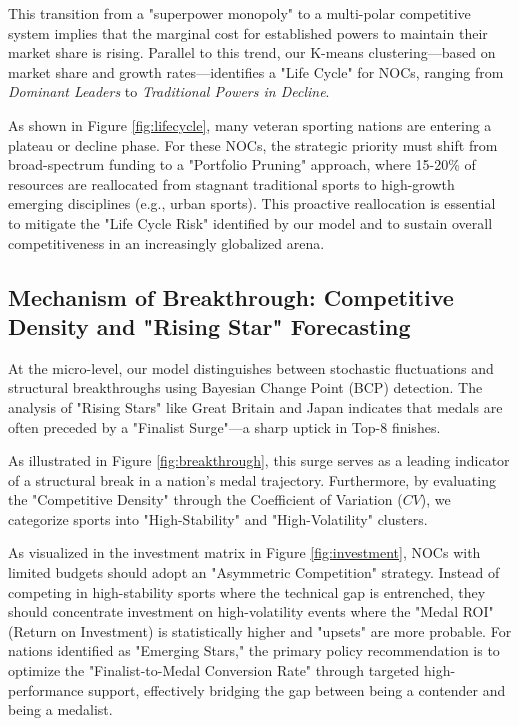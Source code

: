 \documentclass{mcmthesis}
\begin{document}
This transition from a "superpower monopoly" to a multi-polar competitive system implies that the marginal cost for established powers to maintain their market share is rising. Parallel to this trend, our K-means clustering—based on market share and growth rates—identifies a "Life Cycle" for NOCs, ranging from \textit{Dominant Leaders} to \textit{Traditional Powers in Decline}. 



As shown in Figure \ref{fig:lifecycle}, many veteran sporting nations are entering a plateau or decline phase. For these NOCs, the strategic priority must shift from broad-spectrum funding to a "Portfolio Pruning" approach, where 15-20\% of resources are reallocated from stagnant traditional sports to high-growth emerging disciplines (e.g., urban sports). This proactive reallocation is essential to mitigate the "Life Cycle Risk" identified by our model and to sustain overall competitiveness in an increasingly globalized arena.

\subsection{Mechanism of Breakthrough: Competitive Density and "Rising Star" Forecasting}
At the micro-level, our model distinguishes between stochastic fluctuations and structural breakthroughs using Bayesian Change Point (BCP) detection. The analysis of "Rising Stars" like Great Britain and Japan indicates that medals are often preceded by a "Finalist Surge"—a sharp uptick in Top-8 finishes. 



As illustrated in Figure \ref{fig:breakthrough}, this surge serves as a leading indicator of a structural break in a nation's medal trajectory. Furthermore, by evaluating the "Competitive Density" through the Coefficient of Variation ($CV$), we categorize sports into "High-Stability" and "High-Volatility" clusters. 


As visualized in the investment matrix in Figure \ref{fig:investment}, NOCs with limited budgets should adopt an "Asymmetric Competition" strategy. Instead of competing in high-stability sports where the technical gap is entrenched, they should concentrate investment on high-volatility events where the "Medal ROI" (Return on Investment) is statistically higher and "upsets" are more probable. For nations identified as "Emerging Stars," the primary policy recommendation is to optimize the "Finalist-to-Medal Conversion Rate" through targeted high-performance support, effectively bridging the gap between being a contender and being a medalist.
\end{document}
